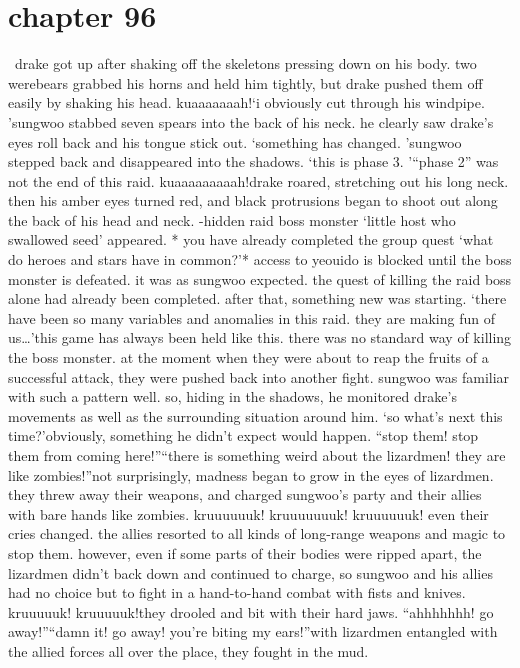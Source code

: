 \section{chapter 96}






 drake got up after shaking off the skeletons pressing down on his body.
 two werebears grabbed his horns and held him tightly, but drake pushed them off easily by shaking his head.
kuaaaaaaah!‘i obviously cut through his windpipe.
’sungwoo stabbed seven spears into the back of his neck.
 he clearly saw drake’s eyes roll back and his tongue stick out.
 ‘something has changed.
’sungwoo stepped back and disappeared into the shadows.
‘this is phase 3.
’“phase 2” was not the end of this raid.
kuaaaaaaaaah!drake roared, stretching out his long neck.
 then his amber eyes turned red, and black protrusions began to shoot out along the back of his head and neck.
-hidden raid boss monster ‘little host who swallowed seed’ appeared.
* you have already completed the group quest ‘what do heroes and stars have in common?’* access to yeouido is blocked until the boss monster is defeated.
it was as sungwoo expected.
 the quest of killing the raid boss alone had already been completed.
 after that, something new was starting.
‘there have been so many variables and anomalies in this raid.
 they are making fun of us…’this game has always been held like this.
 there was no standard way of killing the boss monster.
at the moment when they were about to reap the fruits of a successful attack, they were pushed back into another fight.
sungwoo was familiar with such a pattern well.
 so, hiding in the shadows, he monitored drake’s movements as well as the surrounding situation around him.
‘so what’s next this time?’obviously, something he didn’t expect would happen.
“stop them! stop them from coming here!”“there is something weird about the lizardmen! they are like zombies!”not surprisingly, madness began to grow in the eyes of lizardmen.
 they threw away their weapons, and charged sungwoo’s party and their allies with bare hands like zombies.
kruuuuuuk! kruuuuuuuk! kruuuuuuk!
even their cries changed.
the allies resorted to all kinds of long-range weapons and magic to stop them.
 however, even if some parts of their bodies were ripped apart, the lizardmen didn’t back down and continued to charge, so sungwoo and his allies had no choice but to fight in a hand-to-hand combat with fists and knives.
kruuuuuk! kruuuuuk!they drooled and bit with their hard jaws.
“ahhhhhhh! go away!”“damn it! go away! you’re biting my ears!”with lizardmen entangled with the allied forces all over the place, they fought in the mud.
